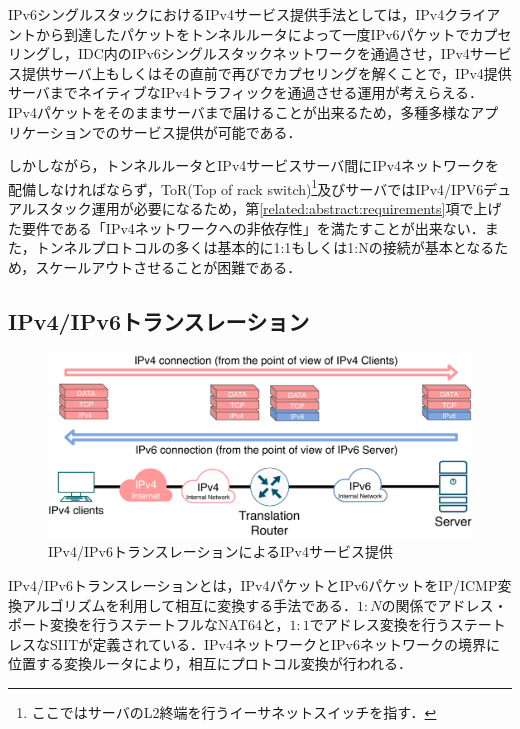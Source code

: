 IPv6シングルスタックにおけるIPv4サービス提供手法としては，IPv4クライアントから到達したパケットをトンネルルータによって一度IPv6パケットでカプセリングし，IDC内のIPv6シングルスタックネットワークを通過させ，IPv4サービス提供サーバ上もしくはその直前で再びでカプセリングを解くことで，IPv4提供サーバまでネイティブなIPv4トラフィックを通過させる運用が考えらえる．
IPv4パケットをそのままサーバまで届けることが出来るため，多種多様なアプリケーションでのサービス提供が可能である．

しかしながら，トンネルルータとIPv4サービスサーバ間にIPv4ネットワークを配備しなければならず，ToR(Top of rack switch)\footnote{ここではサーバのL2終端を行うイーサネットスイッチを指す．}及びサーバではIPv4/IPV6デュアルスタック運用が必要になるため，第\ref{related:abstract:requirements}項で上げた要件である「IPv4ネットワークへの非依存性」を満たすことが出来ない．また，トンネルプロトコルの多く\cite{6799698}は基本的に1:1もしくは1:Nの接続が基本となるため，スケールアウトさせることが困難である．



\subsection{IPv4/IPv6トランスレーション}
\label{related:compare:translation}
\begin{figure}[h]
    \begin{center}
      \includegraphics[width=15cm,pagebox=cropbox,clip]{img/translation_model.pdf}
    \end{center}
    \caption{IPv4/IPv6トランスレーションによるIPv4サービス提供}
    \label{fig:tunneling_model}
\end{figure}

IPv4/IPv6トランスレーションとは，IPv4パケットとIPv6パケットをIP/ICMP変換アルゴリズムを利用して相互に変換する手法である．$1:N$の関係でアドレス・ポート変換を行うステートフルなNAT64\cite{RFC6146}と，$1:1$でアドレス変換を行うステートレスなSIIT\cite{RFC7915}が定義されている．IPv4ネットワークとIPv6ネットワークの境界に位置する変換ルータにより，相互にプロトコル変換が行われる．

